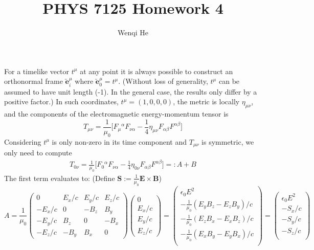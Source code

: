 \documentclass{article}
\title{PHYS 7125 Homework 4}
\author{Wenqi He}
\begin{document}
\maketitle
\section{}
For a timelike vector $t^\mu$ at any point it is always possible to construct an orthonormal frame $\utilde{\mathbf{e}}_i^\mu$  where $\utilde{\mathbf{e}}_0^\mu= t^\mu$. (Without loss of generality, $t^\mu$ can be assumed to have unit length (-1). In the general case, the results only differ by a positive factor.) In such coordinates, $t^\mu = (1,0,0,0)$, the metric is locally $\eta_{\mu\nu}$, and the components of the electromagnetic energy-momentum tensor is
\[ T_{\mu\nu} = \frac{1}{\mu_0}\Big[ F_\mu{}^\alpha F_{\nu\alpha} - \frac{1}{4}\eta_{\mu\nu}F_{\alpha\beta}F^{\alpha\beta} \Big] \]
Considering $t^\mu$ is only non-zero in its time component and $T_{\mu\nu}$ is symmetric, we only need to compute
\begin{align*}
T_{0\nu} = \frac{1}{\mu_0}\Big[ F_0{}^\alpha F_{\nu\alpha} - \frac{1}{4}\eta_{0\nu}F_{\alpha\beta}F^{\alpha\beta} \Big] =: A+ B 
\end{align*}
The first term evaluates to: (Define $\mathbf{S} := \frac{1}{\mu_0}\mathbf{E} \times \mathbf{B}$)
\[
	A = \frac{1}{\mu_0} \begin{pmatrix}
		0 & E_x/c & E_y/c & E_z/c \\
		-E_x/c & 0 & -B_z & B_y \\
		-E_y/c & B_z & 0 & -B_x \\
		-E_z/c & -B_y & B_x & 0
	\end{pmatrix} \begin{pmatrix}
		0 \\ E_x/c \\ E_y/c \\ E_z/c
	\end{pmatrix} = \begin{pmatrix}
		\epsilon_0 E^2 \\
		-\frac{1}{\mu_0}(E_yB_z - E_zB_y)/c \\
		-\frac{1}{\mu_0}(E_zB_x - E_xB_z)/c \\
		-\frac{1}{\mu_0}(E_xB_y - E_yB_x)/c \\
	\end{pmatrix} = \begin{pmatrix}
		\epsilon_0 E^2 \\
		-S_x/c \\
		-S_y/c \\
		-S_z/c \\
	\end{pmatrix}
\]
\end{document}
